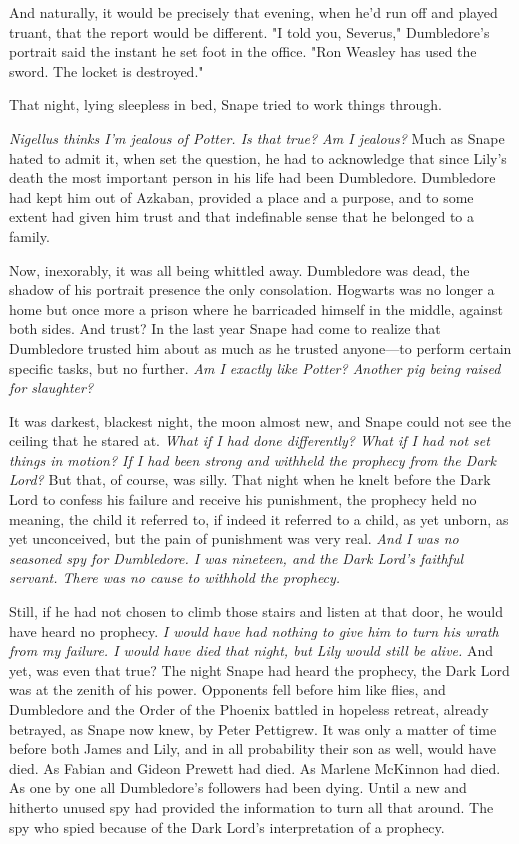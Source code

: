 And naturally, it would be precisely that evening, when he'd run off and played truant, that the report would be different. "I told you, Severus," Dumbledore's portrait said the instant he set foot in the office. "Ron Weasley has used the sword. The locket is destroyed."

That night, lying sleepless in bed, Snape tried to work things through.

\emph{Nigellus thinks I'm jealous of Potter. Is that true? Am I jealous?} Much as Snape hated to admit it, when set the question, he had to acknowledge that since Lily's death the most important person in his life had been Dumbledore. Dumbledore had kept him out of Azkaban, provided a place and a purpose, and to some extent had given him trust and that indefinable sense that he belonged to a family.

Now, inexorably, it was all being whittled away. Dumbledore was dead, the shadow of his portrait presence the only consolation. Hogwarts was no longer a home but once more a prison where he barricaded himself in the middle, against both sides. And trust? In the last year Snape had come to realize that Dumbledore trusted him about as much as he trusted anyone—to perform certain specific tasks, but no further. \emph{Am I exactly like Potter? Another pig being raised for slaughter?}

It was darkest, blackest night, the moon almost new, and Snape could not see the ceiling that he stared at. \emph{What if I had done differently? What if I had not set things in motion? If I had been strong and withheld the prophecy from the Dark Lord?} But that, of course, was silly. That night when he knelt before the Dark Lord to confess his failure and receive his punishment, the prophecy held no meaning, the child it referred to, if indeed it referred to a child, as yet unborn, as yet unconceived, but the pain of punishment was very real. \emph{And I was no seasoned spy for Dumbledore. I was nineteen, and the Dark Lord's faithful servant. There was no cause to withhold the prophecy.}

Still, if he had not chosen to climb those stairs and listen at that door, he would have heard no prophecy. \emph{I would have had nothing to give him to turn his wrath from my failure. I would have died that night, but Lily would still be alive.} And yet, was even that true? The night Snape had heard the prophecy, the Dark Lord was at the zenith of his power. Opponents fell before him like flies, and Dumbledore and the Order of the Phoenix battled in hopeless retreat, already betrayed, as Snape now knew, by Peter Pettigrew. It was only a matter of time before both James and Lily, and in all probability their son as well, would have died. As Fabian and Gideon Prewett had died. As Marlene McKinnon had died. As one by one all Dumbledore's followers had been dying. Until a new and hitherto unused spy had provided the information to turn all that around. The spy who spied because of the Dark Lord's interpretation of a prophecy.

